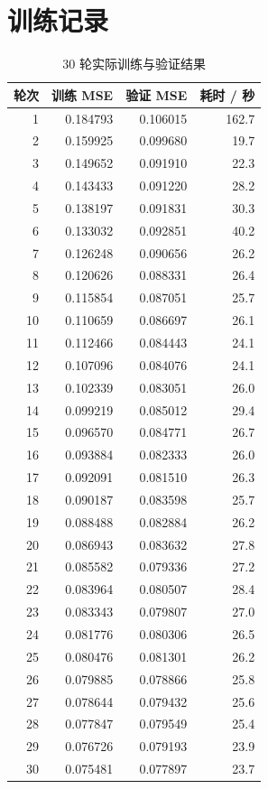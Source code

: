 \documentclass[UTF8,zihao=-4,fontset=windows]{ctexart}
\begin{document}
\section{训练记录}
\begin{table}[H]\centering\caption{30 轮实际训练与验证结果}\small\begin{tabular}{rrrr}\toprule 轮次 & 训练 MSE & 验证 MSE & 耗时 / 秒\\\midrule
1 & 0.184793 & 0.106015 & 162.7 \\
2 & 0.159925 & 0.099680 & 19.7 \\
3 & 0.149652 & 0.091910 & 22.3 \\
4 & 0.143433 & 0.091220 & 28.2 \\
5 & 0.138197 & 0.091831 & 30.3 \\
6 & 0.133032 & 0.092851 & 40.2 \\
7 & 0.126248 & 0.090656 & 26.2 \\
8 & 0.120626 & 0.088331 & 26.4 \\
9 & 0.115854 & 0.087051 & 25.7 \\
10 & 0.110659 & 0.086697 & 26.1 \\
11 & 0.112466 & 0.084443 & 24.1 \\
12 & 0.107096 & 0.084076 & 24.1 \\
13 & 0.102339 & 0.083051 & 26.0 \\
14 & 0.099219 & 0.085012 & 29.4 \\
15 & 0.096570 & 0.084771 & 26.7 \\
16 & 0.093884 & 0.082333 & 26.0 \\
17 & 0.092091 & 0.081510 & 26.3 \\
18 & 0.090187 & 0.083598 & 25.7 \\
19 & 0.088488 & 0.082884 & 26.2 \\
20 & 0.086943 & 0.083632 & 27.8 \\
21 & 0.085582 & 0.079336 & 27.2 \\
22 & 0.083964 & 0.080507 & 28.4 \\
23 & 0.083343 & 0.079807 & 27.0 \\
24 & 0.081776 & 0.080306 & 26.5 \\
25 & 0.080476 & 0.081301 & 26.2 \\
26 & 0.079885 & 0.078866 & 25.8 \\
27 & 0.078644 & 0.079432 & 25.6 \\
28 & 0.077847 & 0.079549 & 25.4 \\
29 & 0.076726 & 0.079193 & 23.9 \\
30 & 0.075481 & 0.077897 & 23.7 \\
\bottomrule\end{tabular}\end{table}
\newpage
\end{document}
